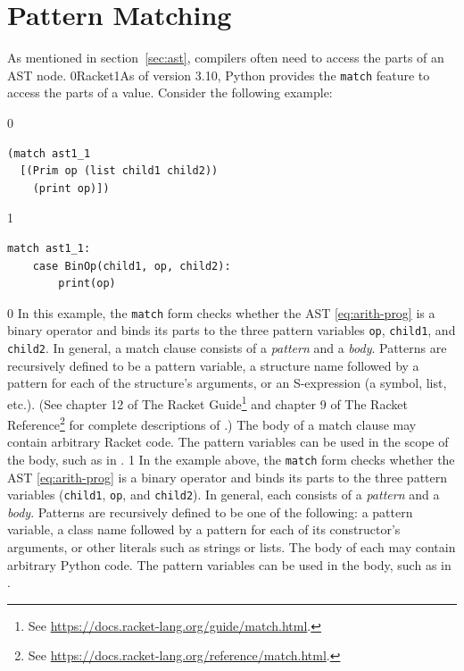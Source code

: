 \documentclass[7x10]{TimesAPriori_MIT}%
\def\racketEd{0}
\def\pythonEd{1}
\def\edition{1}
\newcommand{\racket}[1]{{\if\edition\racketEd{#1}\fi}}
\newcommand{\pythonColor}[0]{}
\newcommand{\python}[1]{{\if\edition\pythonEd\pythonColor #1\fi}}
\numberwithin{theorem}{chapter}
\numberwithin{definition}{chapter}
\numberwithin{equation}{chapter}
\begin{document}
\section{Pattern Matching}
\label{sec:pattern-matching}

As mentioned in section~\ref{sec:ast}, compilers often need to access
the parts of an AST node. \racket{Racket}\python{As of version 3.10, Python}
provides the \texttt{match} feature to access the parts of a value.
Consider the following example:  
\begin{center}
\begin{minipage}{0.5\textwidth}
{\if\edition\racketEd
\begin{lstlisting}
(match ast1_1
  [(Prim op (list child1 child2))
    (print op)])
\end{lstlisting}
\fi}
{\if\edition\pythonEd\pythonColor
\begin{lstlisting}
match ast1_1:
    case BinOp(child1, op, child2):
        print(op)
\end{lstlisting}
\fi}  
\end{minipage}
\end{center}

{\if\edition\racketEd
%
In this example, the \texttt{match} form checks whether the AST
\eqref{eq:arith-prog} is a binary operator and binds its parts to the
three pattern variables \texttt{op}, \texttt{child1}, and
\texttt{child2}. In general, a match clause consists of a
\emph{pattern} and a \emph{body}. Patterns are
recursively defined to be a pattern variable, a structure name
followed by a pattern for each of the structure's arguments, or an
S-expression (a symbol, list, etc.).  (See chapter 12 of The Racket
Guide\footnote{See \url{https://docs.racket-lang.org/guide/match.html}.}
and chapter 9 of The Racket
Reference\footnote{See \url{https://docs.racket-lang.org/reference/match.html}.}
for complete descriptions of .)
%
The body of a match clause may contain arbitrary Racket code.  The
pattern variables can be used in the scope of the body, such as
 in .
%
\fi}
%
%
{\if\edition\pythonEd\pythonColor
%  
In the example above, the \texttt{match} form checks whether the AST
\eqref{eq:arith-prog} is a binary operator and binds its parts to the
three pattern variables (\texttt{child1}, \texttt{op}, and
\texttt{child2}). In general, each  consists of a
\emph{pattern} and a \emph{body}. Patterns are
recursively defined to be one of the following: a pattern variable, a
class name followed by a pattern for each of its constructor's
arguments, or other literals such as strings
or lists.
%
The body of each  may contain arbitrary Python code. The
pattern variables can be used in the body, such as  in
.
%
\fi}
\end{document}
